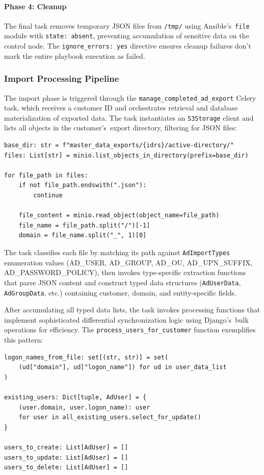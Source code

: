 \paragraph{Phase 4: Cleanup}
The final task removes temporary JSON files from \texttt{/tmp/} using Ansible's~\texttt{file} module with \texttt{state: absent}, preventing accumulation of sensitive data on the control node. The \texttt{ignore\_errors: yes} directive ensures cleanup failures don't mark the entire playbook execution as failed.

\subsubsection{Import Processing Pipeline}

The import phase is triggered through the \texttt{manage\_completed\_ad\_export} Celery task, which receives a customer ID and orchestrates retrieval and database materialization of exported data. The task instantiates an \texttt{S3Storage} client and lists all objects in the customer's~export directory, filtering for JSON files:

\begin{verbatim}
base_dir: str = f"master_data_exports/{idrs}/active-directory/"
files: List[str] = minio.list_objects_in_directory(prefix=base_dir)

for file_path in files:
    if not file_path.endswith(".json"):
        continue
    
    file_content = minio.read_object(object_name=file_path)
    file_name = file_path.split("/")[-1]
    domain = file_name.split("_", 1)[0]
\end{verbatim}

The task classifies each file by matching its path against \texttt{AdImportTypes} enumeration values (AD\_USER, AD\_GROUP, AD\_OU, AD\_UPN\_SUFFIX, AD\_PASSWORD\_POLICY), then invokes type-specific extraction functions that parse JSON content and construct typed data structures (\texttt{AdUserData}, \texttt{AdGroupData}, etc.) containing customer, domain, and entity-specific fields.

After accumulating all typed data lists, the task invokes processing functions that implement sophisticated differential synchronization logic using Django's~bulk operations for efficiency. The \texttt{process\_users\_for\_customer} function exemplifies this pattern:

\begin{verbatim}
logon_names_from_file: set[(str, str)] = set(
    (ud["domain"], ud["logon_name"]) for ud in user_data_list
)

existing_users: Dict[tuple, AdUser] = {
    (user.domain, user.logon_name): user
    for user in all_existing_users.select_for_update()
}

users_to_create: List[AdUser] = []
users_to_update: List[AdUser] = []
users_to_delete: List[AdUser] = []
\end{verbatim}

